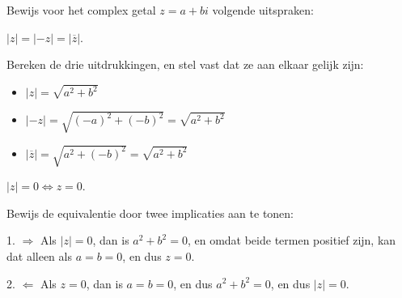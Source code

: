 \documentclass{ximera}
\begin{document}
\begin{xmuitweiding}\nl
    
	\begin{exercise} Bewijs voor het complex getal $z=a+bi$ volgende uitspraken: 
		
		\begin{question} $|z|= |-z| = |\overline{z}|$.
			\begin{oplossing} Bereken de drie uitdrukkingen, en stel vast dat ze aan elkaar gelijk zijn:
				\begin{itemize}
					\item $|z| = \sqrt{a^2+b^2}$
					\item $|-z| = \sqrt{(-a)^2+(-b)^2} = \sqrt{a^2+b^2}$
					\item $|\overline{z}| = \sqrt{a^2+(-b)^2} = \sqrt{a^2+b^2}$
				\end{itemize}
			\end{oplossing}
		\end{question}
			
		\begin{question} $|z| = 0 \iff z = 0$.
			\begin{oplossing}
				Bewijs de equivalentie door twee implicaties aan te tonen:
				
				1. $\boxed{\Rightarrow}$ Als $|z| = 0$, dan is $a^2+b^2 = 0$, en omdat beide termen positief zijn, kan dat alleen als $a=b=0$, en dus $z = 0$.
				
				2. $\boxed{\Leftarrow}$ Als $z = 0$, dan is $a=b=0$, en dus $a^2+b^2 = 0$, en dus $|z| = 0$.
				
			\end{oplossing}
		\end{question}
		
	\end{exercise}
	

\end{xmuitweiding}
\end{document}
